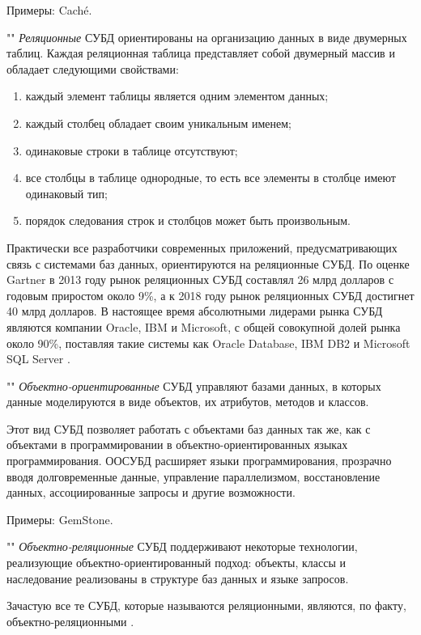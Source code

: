 \documentclass[a4paper,14pt]{extreport}
\begin{document}
Примеры: Caché.

""\newline
\indent\textit{Реляционные} СУБД ориентированы на организацию данных в виде двумерных таблиц. Каждая реляционная таблица представляет собой двумерный массив и обладает следующими свойствами:

\begin{enumerate}
	\setlength\itemsep{0.05em}
	\item каждый элемент таблицы является одним элементом данных;
	\item каждый столбец обладает своим уникальным именем;
	\item одинаковые строки в таблице отсутствуют;
	\item все столбцы в таблице однородные, то есть все элементы в столбце имеют одинаковый тип;
	\item порядок следования строк и столбцов может быть произвольным.
\end{enumerate}

Практически все разработчики современных приложений, предусматривающих связь с системами баз данных, ориентируются на реляционные СУБД. По оценке Gartner в 2013 году рынок реляционных СУБД составлял 26 млрд долларов с годовым приростом около 9\%, а к 2018 году рынок реляционных СУБД достигнет 40 млрд долларов. В настоящее время абсолютными лидерами рынка СУБД являются компании Oracle, IBM и Microsoft, с общей совокупной долей рынка около 90\%, поставляя такие системы как Oracle Database, IBM DB2 и Microsoft SQL Server \cite{dbms}.

""\newline
\indent\textit{Объектно-ориентированные} СУБД управляют базами данных, в которых данные моделируются в виде объектов, их атрибутов, методов и классов.

Этот вид СУБД позволяет работать с объектами баз данных так же, как с объектами в программировании в объектно-ориентированных языках программирования. ООСУБД расширяет языки программирования, прозрачно вводя долговременные данные, управление параллелизмом, восстановление данных, ассоциированные запросы и другие возможности.

Примеры: GemStone.

""\newline
\indent\textit{Объектно-реляционные} СУБД поддерживают некоторые технологии, реализующие объектно-ориентированный подход: объекты, классы и наследование реализованы в структуре баз данных и языке запросов.

Зачастую все те СУБД, которые называются реляционными, являются, по факту, объектно-реляционными \cite{dbms}.
\end{document}
